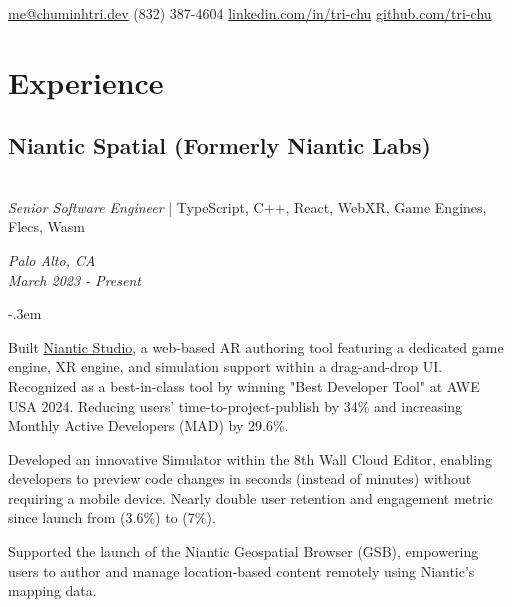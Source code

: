 \documentclass{article}
\makeatletter
\def\faEmail{{\FAFR \symbol{"F0E0}}} %
\def\faPhone{{\FAFR \symbol{"F095}}} %
\def\faLinkedin{{\FAB \symbol{"F08C}}} %
\def\faGithub{{\FAB \symbol{"F09B}}} %
\let\olditemize=\itemize \let\endolditemize=\enditemize
\renewenvironment{itemize}{\olditemize[topsep=0em] \itemsep-.3em}{\endolditemize}
\newcommand{\link}[1]{\href{https://#1}{#1}}
\newenvironment{twocolentry}[2][]{
    \def\secondColumn{#2}
    \raggedright
    \setcolumnwidth{\fill, 6cm}
    \begin{paracol}{2}
}{
    \switchcolumn \raggedleft \secondColumn
    \end{paracol}
} %
\renewcommand{\maketitle}{
  \begin{flushleft}
    \Huge\bfseries\theauthor
  \end{flushleft}
  \begin{bfseries}
    \faEmail    \hspace{1pt} \href{mailto:me@chuminhtri.dev}{me@chuminhtri.dev} \quad
    \faPhone    \hspace{1pt} (832) 387-4604 \quad
    \faLinkedin \hspace{1pt} \link{linkedin.com/in/tri-chu} \quad
    \faGithub   \hspace{1pt} \link{github.com/tri-chu}
  \end{bfseries}
}
\makeatother
\begin{document}
\author{\color{accentcolor}Tri Chu}
\maketitle

\section{Experience}

\begin{twocolentry}{
  \textit{Palo Alto, CA} \\
  \textit{March 2023 - Present}
}
\subsection{Niantic Spatial (Formerly Niantic Labs)}\hfill\\
\textit{Senior Software Engineer} | TypeScript, C++, React, WebXR, Game Engines, Flecs, Wasm 
\end{twocolentry}

\begin{itemize}
  \item Built
  \href{https://www.8thwall.com/blog/post/170524048722/introducing-niantic-studio}{Niantic Studio},
  a web-based AR authoring tool featuring a dedicated game engine, XR engine, and simulation support
  within a drag-and-drop UI. Recognized as a best-in-class tool by winning "Best Developer Tool" at
  AWE USA 2024. Reducing users’ time-to-project-publish by 34\% and increasing Monthly Active
  Developers (MAD) by 29.6\%.
  \item Developed an innovative Simulator within the 8th Wall Cloud Editor, enabling developers to
  preview code changes in seconds (instead of minutes) without requiring a mobile device. Nearly
  double user retention and engagement metric since launch from (3.6\%) to (7\%).
  \item Supported the launch of the Niantic Geospatial Browser (GSB), empowering users to author and
  manage location-based content remotely using Niantic’s mapping data.
\end{itemize}
\end{document}
